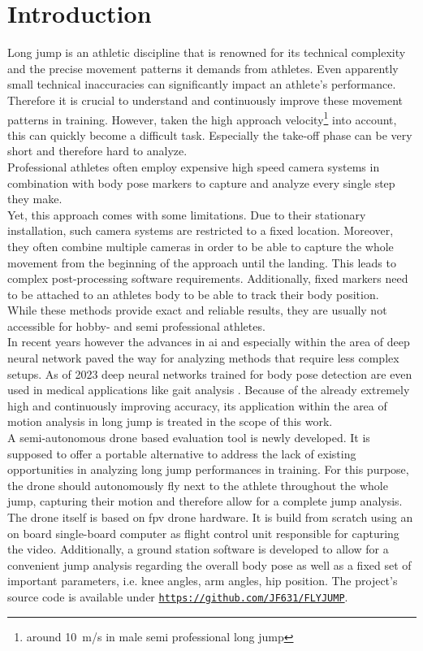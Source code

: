 \chapter{Introduction}
Long jump is an athletic discipline that is renowned for its technical
complexity and the precise movement patterns it demands from athletes.
Even apparently small technical inaccuracies can significantly impact an
athlete's performance.
Therefore it is crucial to understand and continuously improve these movement 
patterns in training.
However, taken the high approach velocity\footnote{around 10~m/s in male semi 
professional long jump} into account, this can quickly become a difficult 
task.
Especially the take-off phase can be very short and therefore hard to analyze.\\

\noindent Professional athletes often employ expensive high speed camera 
systems in combination with body pose markers to capture and analyze every 
single step they make.\\
Yet, this approach comes with some limitations.
Due to their stationary installation, such camera systems are restricted to a
fixed location.
Moreover, they often combine multiple cameras in order to be able to capture 
the whole movement from the beginning of the approach until the 
landing.
This leads to complex post-processing software requirements.
Additionally, fixed markers need to be attached to an athletes body to be able 
to track their body position.\\

\noindent While these methods provide exact and reliable results, they are 
usually not accessible for hobby- and semi professional athletes.\\
In recent years however the advances in \ac{ai} and especially within the area 
of deep neural network paved the way for analyzing methods that require less 
complex setups.
As of 2023 deep neural networks trained for body pose detection are even used 
in medical applications like gait analysis \cite{mp_gait_analysis}.
Because of the already extremely high and continuously improving accuracy, 
its application within the area of motion analysis in long jump is treated in 
the scope of this work.\\
A semi-autonomous drone based evaluation tool is newly developed.
It is supposed to offer a portable alternative to address the lack of existing
opportunities in analyzing long jump performances in training.
For this purpose, the drone should autonomously fly next to the athlete 
throughout the whole jump, capturing their motion and therefore allow for a 
complete jump analysis.
The drone itself is based on \ac{fpv} drone hardware.
It is build from scratch using an on board single-board computer as flight 
control unit responsible for capturing the video.
Additionally, a ground station software is developed to allow for a convenient
jump analysis regarding the overall body pose as well as a fixed set of 
important parameters, i.e. knee angles, arm angles, hip position. 
The project's source code is available under \texttt{\url{https://github.com/JF631/FLYJUMP}}.
